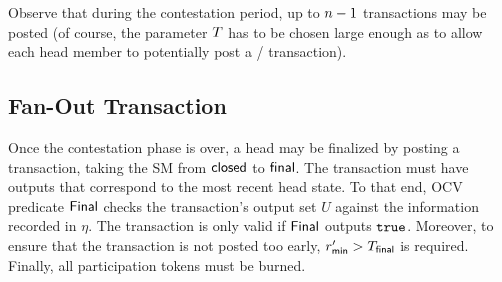 Observe that during the contestation period, up to $n-1$
\mtxContest{} transactions may be posted (of course, the parameter
$T$ has to be chosen large enough as to allow each head member to
potentially post a \mtxClose{}/\mtxContest{} transaction).






\subsection{Fan-Out Transaction}  

Once the contestation phase is over, a head
may be finalized by posting a \mtxFanout{} transaction, taking the SM
from $\mathsf{closed}$ to $\mathsf{final}$.  The \mtxFanout{} transaction must
have outputs that correspond to the most recent head state.  To that
end, OCV predicate $\mathsf{Final}$ checks the transaction's output set $U$
against the information recorded in $\eta$.  The \mtxFanout{}
transaction is only valid if $\mathsf{Final}$ outputs $\mathtt{true}$.  Moreover,
to ensure that the \mtxFanout{} transaction is not posted too early,
$r_{\mathsf{min}}' > T_{\mathsf{final}}$ is required.  Finally, all participation tokens
must be burned.


